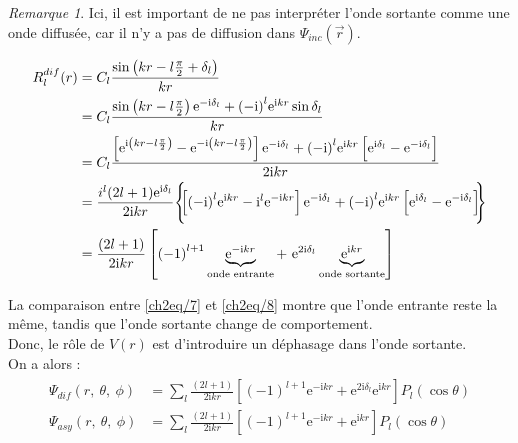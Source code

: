 \documentclass[12pt,a4paper,oneside,french]{book}
\renewcommand{\i}{\mathrm{i}}
\newcommand{\e}{\mathrm{e}}
\theoremstyle{definition}
\theoremstyle{definition}
\theoremstyle{definition}
\theoremstyle{remark}
\newtheorem*{remark}{Remarque}
\theoremstyle{definition}
\begin{document}
    \begin{remark}
        Ici, il est important de ne pas interpréter l'onde sortante comme une onde diffusée, car il n'y a pas de diffusion dans ${\Psi}_{inc}(\vec{r})$.
    \end{remark}
    
    \begin{equation} \label{ch2eq/8}
    \begin{split}
        {R}_{l}^{dif}(r) 
            &= {C}_{l} \frac{\sin\left(k r - l \frac{\pi}{2} + {\delta}_{l}\right)}{k r} \\
            &= {C}_{l} \frac{\sin\left(k r - l \frac{\pi}{2}\right) {\e}^{-\i {\delta}_{l}} + {(-\i)}^{l} {\e}^{\i k r} \sin{{\delta}_{l}}}{k r} \\
            &= {C}_{l} \frac{\left[{\e}^{\i \left(k r - l \frac{\pi}{2}\right)} - {\e}^{-\i \left(k r - l \frac{\pi}{2}\right)}\right] {\e}^{-\i {\delta}_{l}} + {(-\i)}^{l} {\e}^{\i k r} \left[{\e}^{\i {\delta}_{l}} - {\e}^{-\i {\delta}_{l}}\vphantom{{\e}^{\i \left(k r - l \frac{\pi}{2}\right)}}\right]}{2 \i k r} \\
            &= \frac{{i}^{l} (2l + 1) {\e}^{\i {\delta}_{l}}}{2 \i k r} \Bigg\{\!\!\!\left[{(-\i)}^{l} {\e}^{\i k r} - {\i}^{l} {\e}^{-\i k r}\right] {\e}^{-\i {\delta}_{l}} + {(-\i)}^{l} {\e}^{\i k r} \left[{\e}^{\i {\delta}_{l}} - {\e}^{-\i {\delta}_{l}}\vphantom{{(-\i)}^{l} {\e}^{\i k r}}\right]\!\!\!\Bigg\} \\
            &= \frac{(2l + 1)}{2 \i k r} \left[{(-1)}^{l + 1} \underbrace{{\e}^{-\i k r}}_{\text{onde entrante}} + \ {\e}^{2\i {\delta}_{l}} \underbrace{{\e}^{\i k r}}_{\text{onde sortante}}\right] \\
    \end{split}
    \end{equation}
    
    La comparaison entre \eqref{ch2eq/7} et \eqref{ch2eq/8} montre que l'onde entrante reste la même, tandis que l'onde sortante change de comportement. \\
    
    Donc, le rôle de $V(r)$ est d'introduire un déphasage dans l'onde sortante. \\
    
    On a alors :
    \begin{align*}
    \begin{split}
        {\Psi}_{dif}(r, \ \theta, \ \phi) &= \sum_{l} \frac{(2l + 1)}{2 \i k r} \left[{(-1)}^{l + 1} {\e}^{-\i k r} + {\e}^{2\i {\delta}_{l}} {\e}^{\i k r}\right] {P}_{l}(\cos{\theta}) \\
        {\Psi}_{asy}(r, \ \theta, \ \phi) &= \sum_{l} \frac{(2l + 1)}{2 \i k r} \left[{(-1)}^{l + 1} {\e}^{-\i k r} + {\e}^{\i k r}\right] {P}_{l}(\cos{\theta}) \\
    \end{split}
    \end{align*}
    
\end{document}
